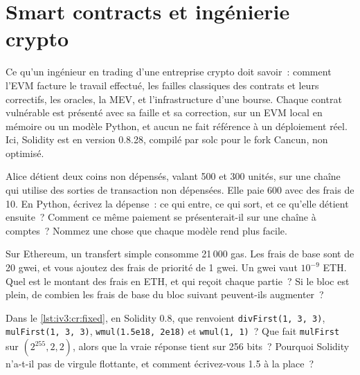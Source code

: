 \chapter{Smart contracts et ingénierie crypto}\label{ch:iv3:smart-contracts-and-crypto-engineering}

\begin{ivtrains}
Ce qu'un ingénieur en trading d'une entreprise crypto doit savoir~: comment l'EVM facture le travail effectué, les failles classiques des contrats et leurs correctifs, les oracles, la MEV, et l'infrastructure d'une bourse. Chaque contrat vulnérable est présenté avec sa faille et sa correction, sur un EVM local en mémoire ou un modèle Python, et aucun ne fait référence à un déploiement réel. Ici, Solidity est en version 0.8.28, compilé par solc pour le fork Cancun, non optimisé.
\end{ivtrains}

\begin{question}\label{iq:iv3:smart-contracts-and-crypto-engineering:1}
Alice détient deux coins non dépensés, valant 500 et 300 unités, sur une chaîne qui utilise des sorties de transaction non dépensées. Elle paie 600 avec des frais de 10. En Python, écrivez la dépense~: ce qui entre, ce qui sort, et ce qu'elle détient ensuite~? Comment ce même paiement se présenterait-il sur une chaîne à comptes~? Nommez une chose que chaque modèle rend plus facile.
\end{question}

\begin{question}\label{iq:iv3:smart-contracts-and-crypto-engineering:2}
Sur Ethereum, un transfert simple consomme 21\,000 gas. Les frais de base sont de 20 gwei, et vous ajoutez des frais de priorité de 1 gwei. Un gwei vaut $10^{-9}$ ETH. Quel est le montant des frais en ETH, et qui reçoit chaque partie~? Si le bloc est plein, de combien les frais de base du bloc suivant peuvent-ils augmenter~?
\end{question}

\begin{question}\label{iq:iv3:smart-contracts-and-crypto-engineering:3}
Dans le \cref{lst:iv3:cr:fixed}, en Solidity 0.8, que renvoient \texttt{divFirst(1, 3, 3)}, \texttt{mulFirst(1, 3, 3)}, \texttt{wmul(1.5e18, 2e18)} et \texttt{wmul(1, 1)}~? Que fait \texttt{mulFirst} sur $(2^{255}, 2, 2)$, alors que la vraie réponse tient sur 256 bits~? Pourquoi Solidity n'a-t-il pas de virgule flottante, et comment écrivez-vous 1.5 à la place~?
\label{lst:iv3:cr:fixed}
\end{question}

